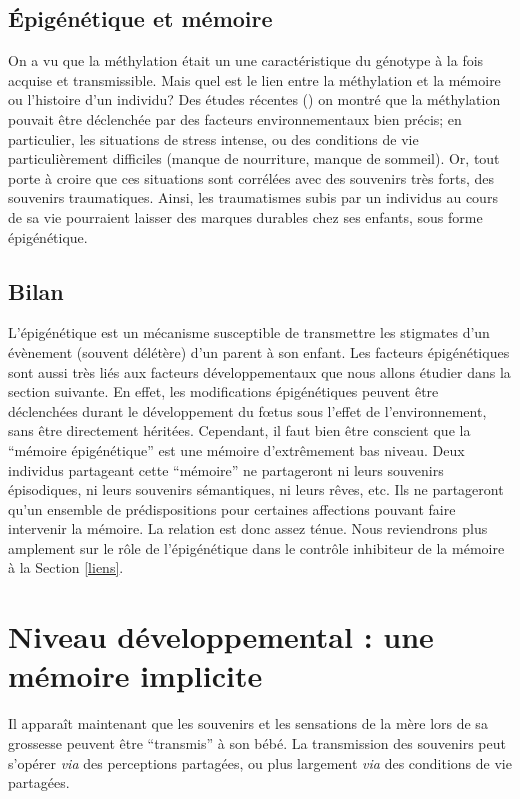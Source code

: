 \documentclass[french]{article}
\begin{document}
			\subsection{Épigénétique et mémoire}
			
				On a vu que la méthylation était un une caractéristique du génotype à la fois acquise et transmissible. Mais quel est le lien entre la méthylation et la mémoire ou l'histoire d'un individu? Des études récentes (\cite{vaiserman2017}) on montré que la méthylation pouvait être déclenchée par des facteurs environnementaux bien précis; en particulier, les situations de stress intense, ou des conditions de vie particulièrement difficiles (manque de nourriture, manque de sommeil). Or, tout porte à croire que ces situations sont corrélées avec des souvenirs très forts, des souvenirs traumatiques. Ainsi, les traumatismes subis par un individus au cours de sa vie pourraient laisser des marques durables chez ses enfants, sous forme épigénétique.
			
			\subsection{Bilan}
				L'épigénétique est un mécanisme susceptible de transmettre les stigmates d'un évènement (souvent délétère) d'un parent à son enfant. Les facteurs épigénétiques sont aussi très liés aux facteurs développementaux que nous allons étudier dans la section suivante. En effet, les modifications épigénétiques peuvent être déclenchées durant le développement du fœtus sous l'effet de l'environnement, sans être directement héritées. Cependant, il faut bien être conscient que la ``mémoire épigénétique'' est une mémoire d'extrêmement bas niveau. Deux individus partageant cette ``mémoire'' ne partageront ni leurs souvenirs épisodiques, ni leurs souvenirs sémantiques, ni leurs rêves, etc. Ils ne partageront qu'un ensemble de prédispositions pour certaines affections pouvant faire intervenir la mémoire. La relation est donc assez ténue. Nous reviendrons plus amplement sur le rôle de l'épigénétique dans le contrôle inhibiteur de la mémoire à la Section \ref{liens}.
				
		\section{Niveau développemental : une mémoire implicite}\label{develo}
			Il apparaît maintenant que les souvenirs et les sensations de la mère lors de sa grossesse peuvent être ``transmis'' à son bébé. La transmission des souvenirs peut s'opérer \textit{via} des perceptions partagées, ou plus largement \textit{via} des conditions de vie partagées.
\end{document}
